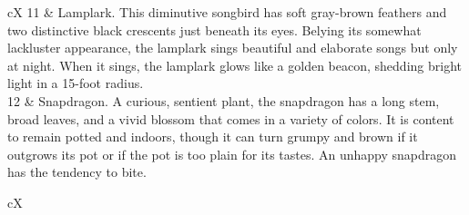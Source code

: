\documentclass[10pt,a4paper,twoside,bg=print,twocolumn,openany,nodeprecatedcode]{dndbook}
\begin{document}
\begin{DndTable}[header=Beloved Pets of the Shadows]{cX}
11 & Lamplark. This diminutive songbird has soft gray-brown feathers and two distinctive black crescents just beneath its eyes. Belying its somewhat lackluster appearance, the lamplark sings beautiful and elaborate songs but only at night. When it sings, the lamplark glows like a golden beacon, shedding bright light in a 15-foot radius.\\
12 & Snapdragon. A curious, sentient plant, the snapdragon has a long stem, broad leaves, and a vivid blossom that comes in a variety of colors. It is content to remain potted and indoors, though it can turn grumpy and brown if it outgrows its pot or if the pot is too plain for its tastes. An unhappy snapdragon has the tendency to bite.\\
\end{DndTable}

\begin{DndTable}[header=Foods of the Shadow Realm]{cX}


\end{DndTable}
\end{document}
